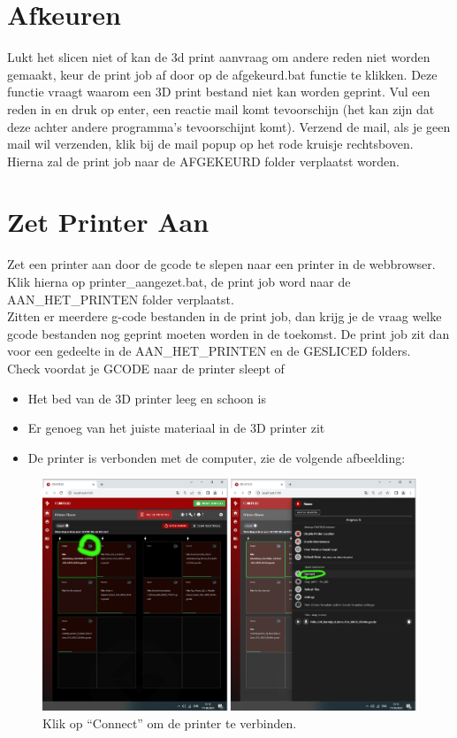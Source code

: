 \documentclass{article}
\newcommand{\quotes}[1]{``#1''}
\begin{document}
\section*{Afkeuren}
Lukt het slicen niet of kan de 3d print aanvraag om andere reden niet worden gemaakt, keur de print job af door op de afgekeurd.bat functie te klikken. Deze functie vraagt waarom een 3D print bestand niet kan worden geprint. Vul een reden in en druk op enter, een reactie mail komt tevoorschijn (het kan zijn dat deze achter andere programma's tevoorschijnt komt). Verzend de mail, als je geen mail wil verzenden, klik bij de mail popup op het rode kruisje rechtsboven. Hierna zal de print job naar de AFGEKEURD folder verplaatst worden.

\section*{Zet Printer Aan}
Zet een printer aan door de gcode te slepen naar een printer in de webbrowser. Klik hierna op printer\_aangezet.bat, de print job word naar de AAN\_HET\_PRINTEN folder verplaatst.\\

Zitten er meerdere g-code bestanden in de print job, dan krijg je de vraag welke gcode bestanden nog geprint moeten worden in de toekomst. De print job zit dan voor een gedeelte in de AAN\_HET\_PRINTEN en de GESLICED folders.\\

\noindent Check voordat je GCODE naar de printer sleept of
\begin{itemize}
  \item Het bed van de 3D printer leeg en schoon is
  \item Er genoeg van het juiste materiaal in de 3D printer zit 
  \item De printer is verbonden met de computer, zie de volgende afbeelding:\\
\end{itemize}

\begin{figure}[H]
    \centering
    \includegraphics[width=1.0\textwidth]{figures/printers_overview}
    \caption*{Klik op \quotes{Connect} om de printer te verbinden.}%
\end{figure}
\end{document}
